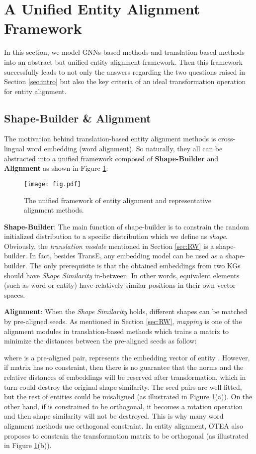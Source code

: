 \documentclass[sigconf,camera-ready]{acmart}
\begin{document}
\section{A Unified Entity Alignment Framework}
\label{sec:transformation}
In this section, we model GNNs-based methods and translation-based methods into an abstract but unified entity alignment framework.
Then this framework successfully leads to not only the answers regarding the two questions raised in Section \ref{sec:intro} but also the key criteria of an ideal transformation operation for entity alignment.

\subsection{Shape-Builder \& Alignment}
\label{4.1}
The motivation behind translation-based entity alignment methods is cross-lingual word embedding (word alignment).
So naturally, they all can be abstracted into a unified framework composed of \textbf{Shape-Builder} and \textbf{Alignment} as shown in Figure \ref{fig:1}:
\begin{figure}[t]
  \centering
\texttt{[image: fig.pdf]}\\
  \caption{The unified framework of entity alignment and representative alignment methods.
}\label{fig:1}
\end{figure}

\textbf{Shape-Builder}:
The main function of shape-builder is to constrain the random initialized distribution to a specific distribution which we define as \emph{shape}.
Obviously, the \emph{translation module} mentioned in Section \ref{sec:RW} is a shape-builder.
In fact, besides TransE, any embedding model can be used as a shape-builder.
The only prerequisite is that the obtained embeddings from two KGs should have \emph{Shape Similarity} in-between. 
In other words, equivalent elements (such as word or entity) have relatively similar positions in their own vector spaces.

\textbf{Alignment}:
When the \emph{Shape Similarity} holds, different shapes can be matched by pre-aligned seeds.
As mentioned in Section \ref{sec:RW}, \emph{mapping} is one of the alignment modules in translation-based methods which trains a matrix  to minimize the distances between the pre-aligned seeds \cite{DBLP:conf/ijcai/ChenTYZ17} as follow:

where  is a pre-aligned pair,  represents the embedding vector of entity .
However, if matrix  has no constraint, then there is no guarantee that the norms and the relative distances of embeddings will be reserved after transformation, which in turn could destroy the original shape similarity.
The seed pairs are well fitted, but the rest of entities could be misaligned (as illustrated in Figure \ref{fig:1}(a)).
On the other hand, if  is constrained to be orthogonal, it becomes a rotation operation and then shape similarity will not be destroyed.
This is why many word alignment methods\cite{DBLP:conf/naacl/XingWLL15,DBLP:conf/iclr/SmithTHH17} use orthogonal constraint.
In entity alignment, OTEA \cite{DBLP:conf/ijcai/Pei0Z19} also proposes to constrain the transformation matrix to be orthogonal (as illustrated in Figure \ref{fig:1}(b)).
\end{document}
